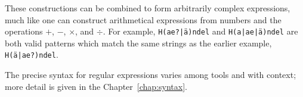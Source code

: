   These constructions can be combined to form arbitrarily complex
  expressions, much like one can construct arithmetical expressions
  from numbers and the operations $+$, $-$, $\times$, and $\div$. For
  example, \texttt{H(ae?|\"a)ndel} and \texttt{H(a|ae|\"a)ndel} are
  both valid patterns which match the same strings as the earlier
  example, \texttt{H(\"a|ae?)ndel}.

  The precise syntax for regular expressions varies among tools and
  with context; more detail is given in the Chapter~\ref{chap:syntax}.
